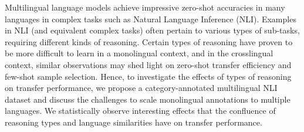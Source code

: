 Multilingual language models achieve impressive zero-shot accuracies in many languages in complex tasks such as Natural Language Inference (NLI). Examples in NLI (and equivalent complex tasks) often pertain to various types of sub-tasks, requiring different kinds of reasoning. Certain types of reasoning have proven to be more difficult to learn in a monolingual context, and in the crosslingual context, similar observations may shed light on zero-shot transfer efficiency and few-shot sample selection. Hence, to investigate the effects of types of reasoning on transfer performance, we propose a category-annotated multilingual NLI dataset and discuss the challenges to scale monolingual annotations to multiple languages. We statistically observe interesting effects that the confluence of reasoning types and language similarities have on transfer performance.
